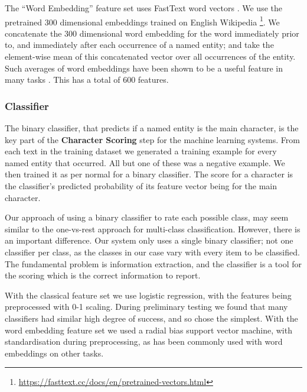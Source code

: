 \documentclass[11pt,a4paper]{article}
\newcommand{\parencite}{\citep}
\newcommand{\textcite}{\cite}
\begin{document}
The ``Word Embedding'' feature set uses FastText word vectors \parencite{bojanowski2016enriching}.
We use the pretrained 300 dimensional embeddings trained on English Wikipedia \footnote{\url{https://fasttext.cc/docs/en/pretrained-vectors.html}}.
We concatenate the 300 dimensional word embedding for the word immediately prior to, and immediately after each occurrence of a named entity;
and take the element-wise mean of this concatenated vector over all occurrences of the  entity.
Such averages of word embeddings have been shown to be a useful feature in many tasks \parencite{White2015SentVecMeaning,mikolovSkip}.
This has a total of 600 features.

\subsubsection{Classifier}
The binary classifier, that predicts if a named entity is the main character, is the key part of the \textbf{Character Scoring} step for the machine learning systems.
From each text in the training dataset
we generated a training example for every named entity that occurred.
All but one of these was a negative example.
We then trained it as per normal for a binary classifier.
The score for a character is the classifier's predicted probability of its feature vector being for the main character.

Our approach of using a binary classifier to rate each possible class,
may seem similar to the one-vs-rest approach for multi-class classification.
However, there is an important difference.
Our system only uses a single binary classifier; not one classifier per class,
as the classes in our case vary with every item to be classified.
The fundamental problem is information extraction, and the classifier is a tool for the scoring which is the correct information to report.


With the classical feature set we use logistic regression, with the features being preprocessed with 0-1 scaling.
During preliminary testing we found that many classifiers had similar high degree of success, and so chose the simplest.
With the word embedding feature set we used a radial bias support vector machine, with  standardisation during preprocessing,
as has been commonly used with word embeddings on other tasks.
\end{document}
